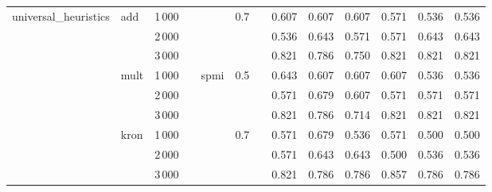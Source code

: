 \begin{tabular}{lllllllrrrrrr}
universal\_heuristics & add & 1\,000 &   &      & 0.7 &   &        0.607 &         0.607 &           0.607 &            0.571 &             0.536 &       0.536 \\
       & {} & 2\,000 &   &      &     &   &        0.536 &         0.643 &           0.571 &            0.571 &             0.643 &       0.643 \\
       & {} & 3\,000 &   &      &     &   &        0.821 &         0.786 &           0.750 &            0.821 &             0.821 &       0.821 \\
       & mult & 1\,000 &   & spmi & 0.5 &   &        0.643 &         0.607 &           0.607 &            0.607 &             0.536 &       0.536 \\
       & {} & 2\,000 &   &      &     &   &        0.571 &         0.679 &           0.607 &            0.571 &             0.571 &       0.571 \\
       & {} & 3\,000 &   &      &     &   &        0.821 &         0.786 &           0.714 &            0.821 &             0.821 &       0.821 \\
       & kron & 1\,000 &   &      & 0.7 &   &        0.571 &         0.679 &           0.536 &            0.571 &             0.500 &       0.500 \\
       & {} & 2\,000 &   &      &     &   &        0.571 &         0.643 &           0.643 &            0.500 &             0.536 &       0.536 \\
       & {} & 3\,000 &   &      &     &   &        0.821 &         0.786 &           0.786 &            0.857 &             0.786 &       0.786 \\
\bottomrule
\end{tabular}
